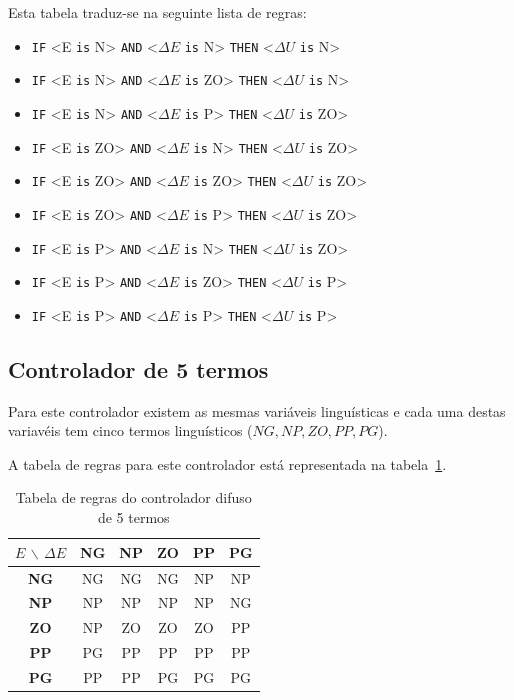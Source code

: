\documentclass{article}
\begin{document}
Esta tabela traduz-se na seguinte lista de regras:
\begin{itemize}
	\item \texttt{IF} <E \texttt{is} N> \texttt{AND} <$\Delta E$ \texttt{is} N> \texttt{THEN} <$\Delta U$ \texttt{is} N>
	\item \texttt{IF} <E \texttt{is} N> \texttt{AND} <$\Delta E$ \texttt{is} ZO> \texttt{THEN} <$\Delta U$ \texttt{is} N>
	\item \texttt{IF} <E \texttt{is} N> \texttt{AND} <$\Delta E$ \texttt{is} P> \texttt{THEN} <$\Delta U$ \texttt{is} ZO>
	\item \texttt{IF} <E \texttt{is} ZO> \texttt{AND} <$\Delta E$ \texttt{is} N> \texttt{THEN} <$\Delta U$ \texttt{is} ZO>
	\item \texttt{IF} <E \texttt{is} ZO> \texttt{AND} <$\Delta E$ \texttt{is} ZO> \texttt{THEN} <$\Delta U$ \texttt{is} ZO>
	\item \texttt{IF} <E \texttt{is} ZO> \texttt{AND} <$\Delta E$ \texttt{is} P> \texttt{THEN} <$\Delta U$ \texttt{is} ZO>
	\item \texttt{IF} <E \texttt{is} P> \texttt{AND} <$\Delta E$ \texttt{is} N> \texttt{THEN} <$\Delta U$ \texttt{is} ZO>
	\item \texttt{IF} <E \texttt{is} P> \texttt{AND} <$\Delta E$ \texttt{is} ZO> \texttt{THEN} <$\Delta U$ \texttt{is} P>
	\item \texttt{IF} <E \texttt{is} P> \texttt{AND} <$\Delta E$ \texttt{is} P> \texttt{THEN} <$\Delta U$ \texttt{is} P>
\end{itemize}

\clearpage

\subsection{Controlador de 5 termos}
\indent \indent Para este controlador existem as mesmas variáveis linguísticas e cada uma destas variavéis tem cinco termos linguísticos (${NG,NP,ZO,PP,PG}$).

A tabela de regras para este controlador está representada na tabela~\ref{5_terms_fuzzy}.

\begin{table}[!h]
\centering
	\caption{Tabela de regras do controlador difuso de 5 termos}
	\label{5_terms_fuzzy}
	\begin{tabular}{|c|c|c|c|c|c|}
	\hline
	$E$ $\backslash$ $\Delta E$ & \textbf{NG} & \textbf{NP} & \textbf{ZO} & \textbf{PP} & \textbf{PG} \\ 
	\hline 
	\textbf{NG} & NG & NG & NG & NP & NP \\ 
	\hline 
	\textbf{NP} & NP & NP & NP & NP & NG \\ 
	\hline 
	\textbf{ZO} & NP & ZO & ZO & ZO & PP \\ 
	\hline
	\textbf{PP} & PG & PP & PP & PP & PP \\ 
	\hline 
	\textbf{PG} & PP & PP & PG & PG & PG \\ 
	\hline 
	\end{tabular} 
\end{table}
\end{document}
